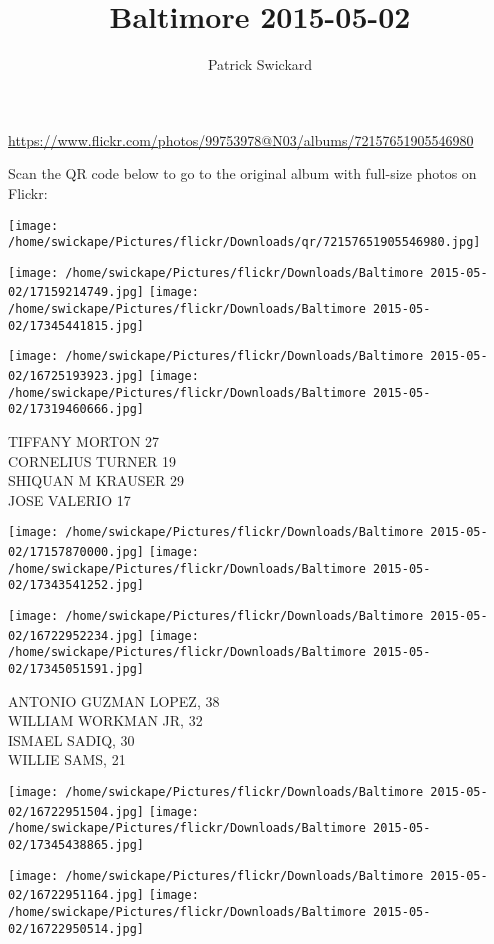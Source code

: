 \documentclass[10pt,letterpaper]{article}
\title{Baltimore 2015-05-02}
\author{Patrick Swickard}
\date{}
\begin{document}
\maketitle

\url{https://www.flickr.com/photos/99753978@N03/albums/72157651905546980}

Scan the QR code below to go to the original album with full-size photos on Flickr:

\texttt{[image: /home/swickape/Pictures/flickr/Downloads/qr/72157651905546980.jpg]}
\pagebreak

\texttt{[image: /home/swickape/Pictures/flickr/Downloads/Baltimore 2015-05-02/17159214749.jpg]}
\texttt{[image: /home/swickape/Pictures/flickr/Downloads/Baltimore 2015-05-02/17345441815.jpg]}

\texttt{[image: /home/swickape/Pictures/flickr/Downloads/Baltimore 2015-05-02/16725193923.jpg]}
\texttt{[image: /home/swickape/Pictures/flickr/Downloads/Baltimore 2015-05-02/17319460666.jpg]}

TIFFANY MORTON 27\\
CORNELIUS TURNER 19\\
SHIQUAN M KRAUSER 29\\
JOSE VALERIO 17
\pagebreak

\texttt{[image: /home/swickape/Pictures/flickr/Downloads/Baltimore 2015-05-02/17157870000.jpg]}
\texttt{[image: /home/swickape/Pictures/flickr/Downloads/Baltimore 2015-05-02/17343541252.jpg]}

\texttt{[image: /home/swickape/Pictures/flickr/Downloads/Baltimore 2015-05-02/16722952234.jpg]}
\texttt{[image: /home/swickape/Pictures/flickr/Downloads/Baltimore 2015-05-02/17345051591.jpg]}

ANTONIO GUZMAN LOPEZ, 38\\
WILLIAM WORKMAN JR, 32\\
ISMAEL SADIQ, 30\\
WILLIE SAMS, 21
\pagebreak

\texttt{[image: /home/swickape/Pictures/flickr/Downloads/Baltimore 2015-05-02/16722951504.jpg]}
\texttt{[image: /home/swickape/Pictures/flickr/Downloads/Baltimore 2015-05-02/17345438865.jpg]}

\texttt{[image: /home/swickape/Pictures/flickr/Downloads/Baltimore 2015-05-02/16722951164.jpg]}
\texttt{[image: /home/swickape/Pictures/flickr/Downloads/Baltimore 2015-05-02/16722950514.jpg]}
\end{document}
